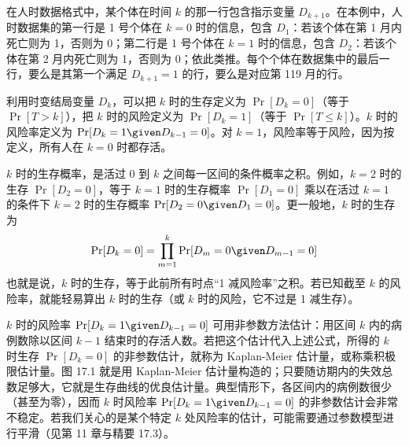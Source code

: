 \begin{figure}[htbp]
\centering
{}
\caption{}
\label{fig:17.2}
\end{figure}

在人时数据格式中，某个体在时间 $k$ 的那一行包含指示变量 $D_{k+1}$。在本例中，人时数据集的第一行是 1 号个体在 $k=0$ 时的信息，包含 $D_1$：若该个体在第 1 月内死亡则为 1，否则为 0；第二行是 1 号个体在 $k=1$ 时的信息，包含 $D_2$：若该个体在第 2 月内死亡则为 1，否则为 0；依此类推。每个个体在数据集中的最后一行，要么是其第一个满足 $D_{k+1}=1$ 的行，要么是对应第 119 月的行。


利用时变结局变量 $D_k$，可以把 $k$ 时的生存定义为 $\Pr[D_k=0]$（等于 $\Pr[T>k]$），把 $k$ 时的风险定义为 $\Pr[D_k=1]$（等于 $\Pr[T\le k]$）。$k$ 时的风险率定义为 $\Pr[D_k=1\given D_{k-1}=0]$。对 $k=1$，风险率等于风险，因为按定义，所有人在 $k=0$ 时都存活。

$k$ 时的生存概率，是活过 0 到 $k$ 之间每一区间的条件概率之积。例如，$k=2$ 时的生存 $\Pr[D_2=0]$，等于 $k=1$ 时的生存概率 $\Pr[D_1=0]$ 乘以在活过 $k=1$ 的条件下 $k=2$ 时的生存概率 $\Pr[D_2=0\given D_1=0]$。更一般地，$k$ 时的生存为
\[
\Pr[D_k=0]=\prod_{m=1}^{k}\Pr[D_m=0\given D_{m-1}=0]
\]
也就是说，$k$ 时的生存，等于此前所有时点“1 减风险率”之积。若已知截至 $k$ 的风险率，就能轻易算出 $k$ 时的生存（或 $k$ 时的风险，它不过是 1 减生存）。

$k$ 时的风险率 $\Pr[D_k=1\given D_{k-1}=0]$ 可用非参数方法估计：用区间 $k$ 内的病例数除以区间 $k-1$ 结束时的存活人数。若把这个估计代入上述公式，所得的 $k$ 时生存 $\Pr[D_k=0]$ 的非参数估计，就称为 Kaplan-Meier 估计量，或称乘积极限估计量。图 17.1 就是用 Kaplan-Meier 估计量构造的；只要随访期内的失效总数足够大，它就是生存曲线的优良估计量。典型情形下，各区间内的病例数很少（甚至为零），因而 $k$ 时风险率 $\Pr[D_k=1\given D_{k-1}=0]$ 的非参数估计会非常不稳定。若我们关心的是某个特定 $k$ 处风险率的估计，可能需要通过参数模型进行平滑（见第 11 章与精要 17.3）。

